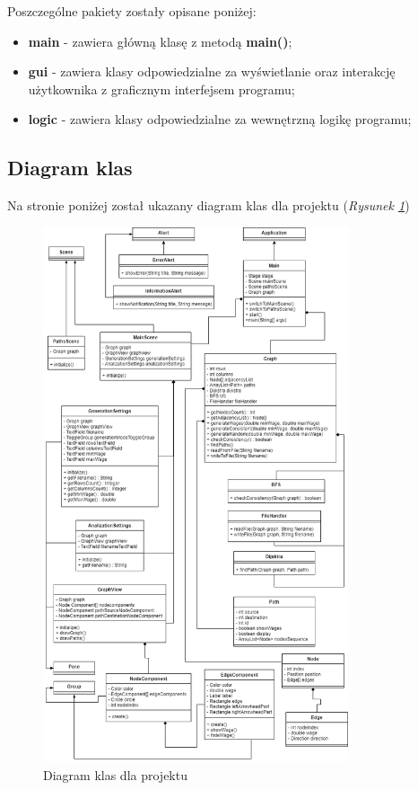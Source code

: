 \documentclass{article}
\begin{document}
Poszczególne pakiety zostały opisane poniżej:
\begin{itemize}
    \item \textbf{main} - zawiera główną klasę z metodą \textbf{main()};
    \item \textbf{gui} - zawiera klasy odpowiedzialne za wyświetlanie oraz interakcję użytkownika z graficznym interfejsem programu;
    \item \textbf{logic} - zawiera klasy odpowiedzialne za wewnętrzną logikę programu;
\end{itemize}

\subsection{Diagram klas}
Na stronie poniżej został ukazany diagram klas dla projektu (\emph{Rysunek \ref{fig:g7}})



\begin{figure}[htp]
        \centering
        \includegraphics[width=9cm]{Images/diagramklas.png}
        \caption{Diagram klas dla projektu}
        \label{fig:g7}
    \end{figure}
\newpage
\end{document}

